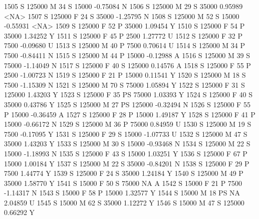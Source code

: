 \documentclass{article}
\begin{document}
\begin{Schunk}
\begin{Soutput}
1505      S     125000   M  34         S  15000  -0.75084    N
1506      S     125000   M  29         S  35000   0.95989 <NA>
1507      S     125000   F  24         S  35000  -1.25795    N
1508      S     125000   M  52         S  15000  -0.55931 <NA>
1509      S     125000   F  52         P  35000   1.09454    Y
1510      S     125000   F  54         P  35000   1.34252    Y
1511      S     125000   F  45         P   2500   1.27772    U
1512      S     125000   F  32         P   7500  -0.09680    U
1513      S     125000   M  40         P   7500   0.70614    U
1514      S     125000   M  34         P   7500  -0.84411    N
1515      S     125000   M  44         P  15000  -0.12988    A
1516      S     125000   M  39         S  75000  -1.14049    N
1517      S     125000   F  40         S 125000   0.14576    A
1518      S     125000   F  55         P   2500  -1.00723    N
1519      S     125000   F  21         P  15000   0.11541    Y
1520      S     125000   M  18         S   7500  -1.15309    N
1521      S     125000   M  70         S  75000   1.05894    Y
1522      S     125000   F  31         S 125000   1.43203    Y
1523      S     125000   F  35        PS  75000   1.03393    Y
1524      S     125000   F  40         S  35000   0.43786    Y
1525      S     125000   M  27        PS 125000  -0.32494    N
1526      S     125000   F  55         P  15000  -0.36459    A
1527      S     125000   F  28         P  15000   1.49187    Y
1528      S     125000   F  41         P  15000  -0.66172    N
1529      S     125000   M  36         P  75000   0.84959    U
1530      S     125000   M  19         S   7500  -0.17095    Y
1531      S     125000   F  29         S  15000  -1.07733    U
1532      S     125000   M  47         S  35000   1.43203    Y
1533      S     125000   M  30         S  15000  -0.93468    N
1534      S     125000   M  22         S  15000  -1.18993    N
1535      S     125000   F  43         S  15000   1.03251    Y
1536      S     125000   F  67         P  15000   1.00184    Y
1537      S     125000   M  22         S  35000  -0.84201    N
1538      S     125000   F  29         P   7500   1.44774    Y
1539      S     125000   F  24         S  35000   1.24184    Y
1540      S     125000   M  49         P  35000   1.58770    Y
1541      S      15000   F  50         S  75000        NA    A
1542      S      15000   F  21         P   7500  -1.14317    N
1543      S      15000   F  58         P  15000   1.32577    Y
1544      S      15000   M  18        PS     NA   2.04859    U
1545      S      15000   M  62         S  35000   1.12272    Y
1546      S      15000   M  47         S 125000   0.66292    Y

\end{Soutput}
\end{Schunk}
\end{document}
